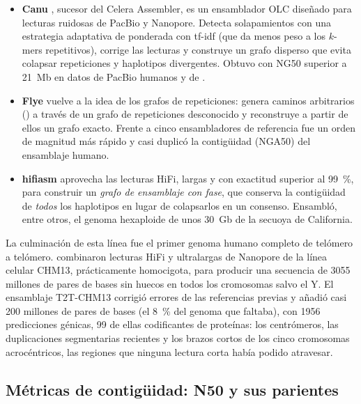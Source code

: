 \begin{itemize}
  \item \textbf{Canu} \parencite{c08-koren2017}, sucesor del Celera Assembler, es un ensamblador OLC diseñado para lecturas ruidosas de PacBio y Nanopore. Detecta solapamientos con una estrategia adaptativa de  ponderada con tf-idf (que da menos peso a los $k$-mers repetitivos), corrige las lecturas y construye un grafo disperso que evita colapsar repeticiones y haplotipos divergentes. Obtuvo  con NG50 superior a \SI{21}{Mb} en datos de PacBio humanos y de .
  \item \textbf{Flye} \parencite{c08-kolmogorov2019} vuelve a la idea de los grafos de repeticiones: genera caminos arbitrarios () a través de un grafo de repeticiones desconocido y reconstruye a partir de ellos un grafo exacto. Frente a cinco ensambladores de referencia fue un orden de magnitud más rápido y casi duplicó la contigüidad (NGA50) del ensamblaje humano.
  \item \textbf{hifiasm} \parencite{c08-cheng2021} aprovecha las lecturas HiFi, largas y con exactitud superior al \SI{99}{\percent}, para construir un \emph{grafo de ensamblaje con fase}, que conserva la contigüidad de \emph{todos} los haplotipos en lugar de colapsarlos en un consenso. Ensambló, entre otros, el genoma hexaploide de unos \SI{30}{Gb} de la secuoya de California.
\end{itemize}

La culminación de esta línea fue el primer genoma humano completo de telómero a telómero. \textcite{c08-nurk2022} combinaron lecturas HiFi y ultralargas de Nanopore de la línea celular CHM13, prácticamente homocigota, para producir una secuencia de \num{3055} millones de pares de bases sin huecos en todos los cromosomas salvo el Y. El ensamblaje T2T-CHM13 corrigió errores de las referencias previas y añadió casi 200 millones de pares de bases (el \SI{8}{\percent} del genoma que faltaba), con \num{1956} predicciones génicas, 99 de ellas codificantes de proteínas: los centrómeros, las duplicaciones segmentarias recientes y los brazos cortos de los cinco cromosomas acrocéntricos, las regiones que ninguna lectura corta había podido atravesar.

\subsection{Métricas de contigüidad: N50 y sus parientes}

